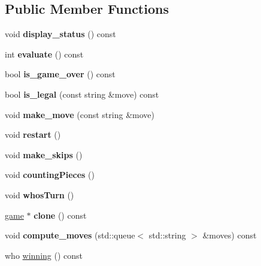 \subsection*{Public Member Functions}
\begin{DoxyCompactItemize}
\item 
\mbox{\label{classmain__savitch__14_1_1_othello_ab01a4f7aba130133221a11224905e8ce}} 
void {\bfseries display\+\_\+status} () const
\item 
\mbox{\label{classmain__savitch__14_1_1_othello_a57ae44590de8d683592f186ed6bd25b0}} 
int {\bfseries evaluate} () const
\item 
\mbox{\label{classmain__savitch__14_1_1_othello_a540c8b0030e429e0ac30f07e9e8868ec}} 
bool {\bfseries is\+\_\+game\+\_\+over} () const
\item 
\mbox{\label{classmain__savitch__14_1_1_othello_a74ac0d4e6399167037dfc708efdb9033}} 
bool {\bfseries is\+\_\+legal} (const string \&move) const
\item 
\mbox{\label{classmain__savitch__14_1_1_othello_a1066b280efa5cb41039585669282fe06}} 
void {\bfseries make\+\_\+move} (const string \&move)
\item 
\mbox{\label{classmain__savitch__14_1_1_othello_abf872b8074bfa4c04119317dc3b39af2}} 
void {\bfseries restart} ()
\item 
\mbox{\label{classmain__savitch__14_1_1_othello_a3177234195a490eef52343d957e64b5d}} 
void {\bfseries make\+\_\+skips} ()
\item 
\mbox{\label{classmain__savitch__14_1_1_othello_a19f49edfbe82b84922877e00bc854ed8}} 
void {\bfseries counting\+Pieces} ()
\item 
\mbox{\label{classmain__savitch__14_1_1_othello_a21440dbb4511812a76c578a5f546710b}} 
void {\bfseries whos\+Turn} ()
\item 
\mbox{\label{classmain__savitch__14_1_1_othello_a7a5f8495f1a61f6e7b3968e919013c18}} 
\mbox{\hyperlink{classmain__savitch__14_1_1game}{game}} $\ast$ {\bfseries clone} () const
\item 
\mbox{\label{classmain__savitch__14_1_1_othello_a921d4ffa277b0250f187f20b9598ebb1}} 
void {\bfseries compute\+\_\+moves} (std\+::queue$<$ std\+::string $>$ \&moves) const
\item 
who \mbox{\hyperlink{classmain__savitch__14_1_1_othello_a4ea78b18eea66c944c0a9356349e0fd4}{winning}} () const
\end{DoxyCompactItemize}
